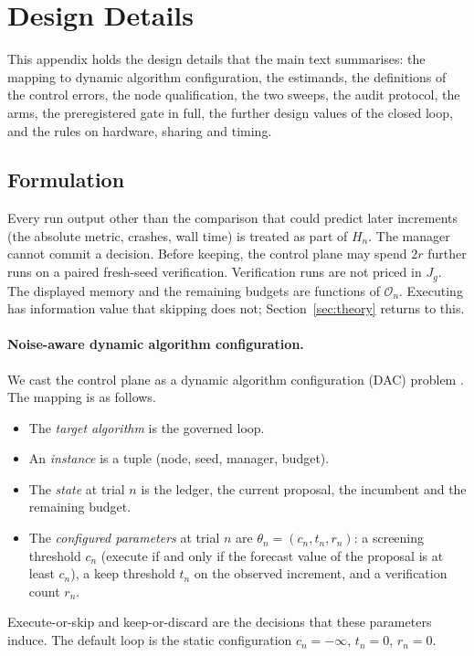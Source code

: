 \section{Design Details}
\label{app:design}

This appendix holds the design details that the main text summarises: the mapping to dynamic algorithm configuration, the estimands, the definitions of the control errors, the node qualification, the two sweeps, the audit protocol, the arms, the preregistered gate in full, the further design values of the closed loop, and the rules on hardware, sharing and timing.

\subsection{Formulation}

Every run output other than the comparison that could predict later increments (the absolute metric, crashes, wall time) is treated as part of $H_n$. The manager cannot commit a decision. Before keeping, the control plane may spend $2r$ further runs on a paired fresh-seed verification. Verification runs are not priced in $J_g$. The displayed memory and the remaining budgets are functions of $\mathcal{O}_n$. Executing has information value that skipping does not; Section~\ref{sec:theory} returns to this.

\paragraph{Noise-aware dynamic algorithm configuration.}
We cast the control plane as a dynamic algorithm configuration (DAC) problem \citep{biedenkapp2020dac,adriaensen2022dac}. The mapping is as follows.
\begin{itemize}
\item The \emph{target algorithm} is the governed loop.
\item An \emph{instance} is a tuple (node, seed, manager, budget).
\item The \emph{state} at trial $n$ is the ledger, the current proposal, the incumbent and the remaining budget.
\item The \emph{configured parameters} at trial $n$ are $\theta_n=(c_n,t_n,r_n)$: a screening threshold $c_n$ (execute if and only if the forecast value of the proposal is at least $c_n$), a keep threshold $t_n$ on the observed increment, and a verification count $r_n$.
\end{itemize}
Execute-or-skip and keep-or-discard are the decisions that these parameters induce. The default loop is the static configuration $c_n=-\infty$, $t_n=0$, $r_n=0$.

